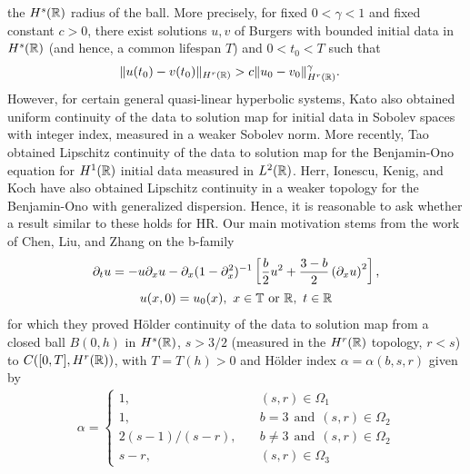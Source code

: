 the $H^{s}(\mathbb{R})$ radius of the ball. More precisely, for fixed $0 < \gamma < 1$
and fixed constant $c > 0$,
there exist solutions $u, v$ of Burgers with bounded initial data in $H^{s}(\mathbb{R})$
(and hence, a common lifespan $T$) and $0 < t_{0} < T$ such that
%
%
\begin{equation*}
\begin{split}
\| u(t_{0}) - v(t_{0}) \|_{H^{r}(\mathbb{R})} 
& > c \| u_{0} - v_{0} \|^{\gamma}_{H^{r}(\mathbb{R})}.
\end{split}
\end{equation*}
However, for certain general quasi-linear hyperbolic systems, Kato also obtained
uniform continuity of the data to solution map for initial data in Sobolev
spaces with integer index, measured in a weaker Sobolev norm. More recently, Tao
\cite{Tao:2004} obtained Lipschitz continuity of the data to solution map
for the Benjamin-Ono equation for $H^{1}(\mathbb{R})$ initial data measured in $L^{2}(\mathbb{R})$.
Herr, Ionescu, Kenig, and Koch \cite{Herr:2010p886} have also obtained Lipschitz
continuity in a weaker topology for the Benjamin-Ono with generalized
dispersion. Hence, it is reasonable to ask whether a result similar to these
holds for HR\@. Our main motivation stems from the work of Chen, Liu, and Zhang
\cite{Chen:2011fk} on the
b-family
%
%
\begin{gather}
\partial_t u =  -u \partial_x u -
\partial_{x} (1 - \partial_{x}^{2})^{-1} \left[ \frac{b}{2}u^2 +
\frac{3-b}{2} \left( \partial_x u \right)^2
\right],
\label{b-family}
\\
u(x,0) = u_0(x), \ x \in \mathbb{T} \ \text{or} \ \mathbb{R}, \ t \in \mathbb{R}
\label{init-cond-iu-b-fam}
\end{gather}
%
%
for which they proved H\"older continuity of the data to solution map from a closed ball $B(0, h)$ in $H^{s}(\mathbb{R})$, $s >
3/2$ (measured in the $H^{r}(\mathbb{R})$ topology, $r <s$) to $C([0, T], H^{r}(\mathbb{R}))$, with $T
= T(h)> 0$ and H\"older index $\alpha = \alpha(b, s, r)$ given by 
%
%
\begin{equation*}
\begin{split}
\alpha = 
\begin{cases}
1, \quad & (s, r) \in \Omega_{1}
\\
1, \quad & b=3 \ \ \text{and} \ \ (s, r) \in \Omega_{2}
\\
2(s-1)/(s-r), \quad  & b\neq 3 \ \ \text{and} \ \ (s, r) \in \Omega_{2}
\\
s-r, \quad & (s, r) \in \Omega_{3}
\end{cases}
\end{split}
\end{equation*}
